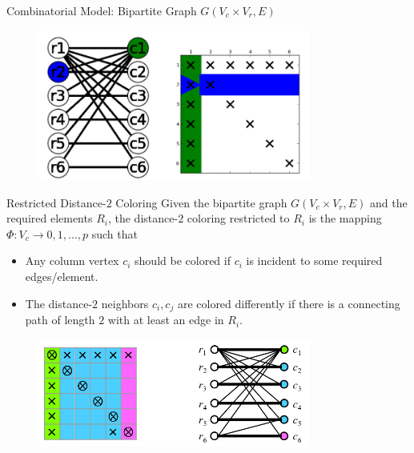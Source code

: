 \documentclass{beamer}
\begin{document}
\begin{frame}{Combinatorial Model: Bipartite Graph}
$G(V_c\times V_r,E)$
\begin{figure}
\centering
\includegraphics[width=0.8\textwidth]{bip}
\end{figure}
\end{frame}

\begin{frame}{Restricted Distance-$2$ Coloring}
Given the bipartite graph $G(V_c\times V_r,E)$ and the required elements
$R_i$, the distance-$2$ coloring restricted to $R_i$ is the mapping 
$\Phi:V_c\to {0,1,...,p}$ such that
\begin{itemize}
\item Any column vertex $c_i$ should be colored if $c_i$ is incident to some required edges/element.
\item The distance-$2$ neighbors $c_i, c_j$ are colored differently
if there is a connecting path of length $2$ with at least an edge in $R_i$.
\end{itemize}
\begin{figure}
\centering
\includegraphics[width=0.8\textwidth]{restricted_distance2}
\end{figure}
\end{frame}
\end{document}
